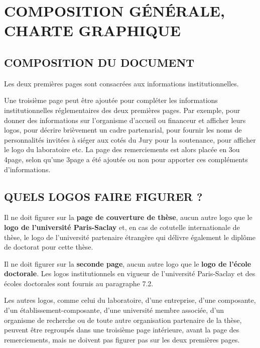 \documentclass[french,12pt,a4paper]{book}
\begin{document}
\chapter{COMPOSITION GÉNÉRALE, CHARTE GRAPHIQUE}
\section{COMPOSITION DU DOCUMENT}
Les deux premières pages sont consacrées aux informations institutionnelles. \\ \par
Une troisième page peut être ajoutée pour compléter les informations institutionnelles réglementaires des deux premières pages. Par exemple, pour donner des informations sur l’organisme d’accueil ou financeur et afficher leurs logos, pour décrire brièvement un cadre partenarial, pour fournir les noms de personnalités invitées à siéger aux cotés du Jury pour la soutenance, pour afficher le logo du laboratoire etc. 
La page des remerciements est alors placée en 3\ieme ou 4\ieme page, selon qu’une 3\ieme page a été ajoutée ou non pour apporter ces compléments d’informations.
\section{QUELS LOGOS FAIRE FIGURER ?}
Il ne doit figurer sur la \textbf{page de couverture de thèse}, aucun autre logo que le \textbf{logo de l’université Paris-Saclay} et, en cas de cotutelle internationale de thèse, le logo de l’université partenaire étrangère qui délivre également le diplôme de doctorat pour cette thèse. \\ \par
Il ne doit figurer sur la \textbf{seconde page}, aucun autre logo que le \textbf{logo de l’école doctorale}.
Les logos institutionnels en vigueur de l’université Paris-Saclay et des écoles doctorales sont fournis au paragraphe 7.2.\\ \par
Les autres logos, comme celui du laboratoire, d’une entreprise, d’une composante, d’un établissement-composante, d’une université membre associée, d’un organisme de recherche ou de toute autre organisation partenaire de la thèse, peuvent être regroupés dans une troisième page intérieure, avant la page des remerciements, mais ne doivent pas figurer pas sur les deux premières pages.
\end{document}
